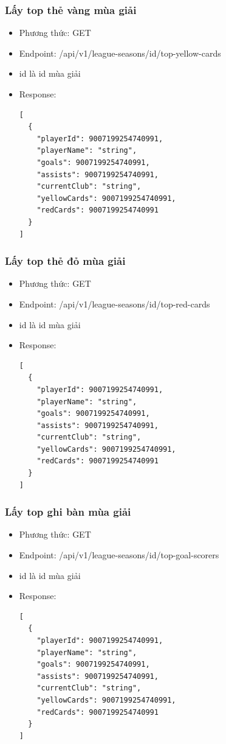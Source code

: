 \documentclass[../BTL.tex]{subfiles}
\begin{document}
\subsubsection{ Lấy top thẻ vàng mùa giải}
\begin{itemize}
    \item Phương thức: GET
    \item Endpoint: /api/v1/league-seasons/{id}/top-yellow-cards
    \item {id} là id mùa giải
    \item Response:
        \begin{verbatim}
[
  {
    "playerId": 9007199254740991,
    "playerName": "string",
    "goals": 9007199254740991,
    "assists": 9007199254740991,
    "currentClub": "string",
    "yellowCards": 9007199254740991,
    "redCards": 9007199254740991
  }
]
        \end{verbatim}
\end{itemize}

\subsubsection{ Lấy top thẻ đỏ mùa giải}
\begin{itemize}
    \item Phương thức: GET
    \item Endpoint: /api/v1/league-seasons/{id}/top-red-cards
    \item {id} là id mùa giải
    \item Response:
        \begin{verbatim}
[
  {
    "playerId": 9007199254740991,
    "playerName": "string",
    "goals": 9007199254740991,
    "assists": 9007199254740991,
    "currentClub": "string",
    "yellowCards": 9007199254740991,
    "redCards": 9007199254740991
  }
]
        \end{verbatim}
\end{itemize}

\subsubsection{ Lấy top ghi bàn mùa giải}
\begin{itemize}
    \item Phương thức: GET
    \item Endpoint: /api/v1/league-seasons/{id}/top-goal-scorers
    \item {id} là id mùa giải
    \item Response:
        \begin{verbatim}
[
  {
    "playerId": 9007199254740991,
    "playerName": "string",
    "goals": 9007199254740991,
    "assists": 9007199254740991,
    "currentClub": "string",
    "yellowCards": 9007199254740991,
    "redCards": 9007199254740991
  }
]
        \end{verbatim}
\end{itemize}
\end{document}
